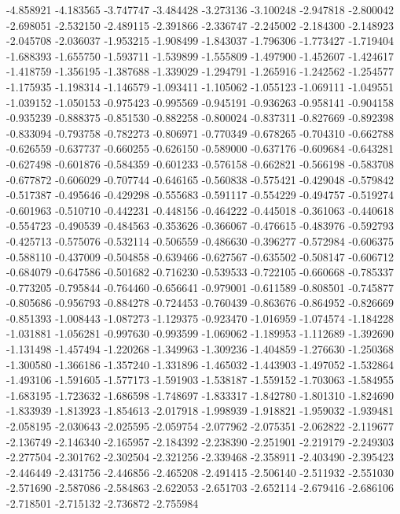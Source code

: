 -4.858921
-4.183565
-3.747747
-3.484428
-3.273136
-3.100248
-2.947818
-2.800042
-2.698051
-2.532150
-2.489115
-2.391866
-2.336747
-2.245002
-2.184300
-2.148923
-2.045708
-2.036037
-1.953215
-1.908499
-1.843037
-1.796306
-1.773427
-1.719404
-1.688393
-1.655750
-1.593711
-1.539899
-1.555809
-1.497900
-1.452607
-1.424617
-1.418759
-1.356195
-1.387688
-1.339029
-1.294791
-1.265916
-1.242562
-1.254577
-1.175935
-1.198314
-1.146579
-1.093411
-1.105062
-1.055123
-1.069111
-1.049551
-1.039152
-1.050153
-0.975423
-0.995569
-0.945191
-0.936263
-0.958141
-0.904158
-0.935239
-0.888375
-0.851530
-0.882258
-0.800024
-0.837311
-0.827669
-0.892398
-0.833094
-0.793758
-0.782273
-0.806971
-0.770349
-0.678265
-0.704310
-0.662788
-0.626559
-0.637737
-0.660255
-0.626150
-0.589000
-0.637176
-0.609684
-0.643281
-0.627498
-0.601876
-0.584359
-0.601233
-0.576158
-0.662821
-0.566198
-0.583708
-0.677872
-0.606029
-0.707744
-0.646165
-0.560838
-0.575421
-0.429048
-0.579842
-0.517387
-0.495646
-0.429298
-0.555683
-0.591117
-0.554229
-0.494757
-0.519274
-0.601963
-0.510710
-0.442231
-0.448156
-0.464222
-0.445018
-0.361063
-0.440618
-0.554723
-0.490539
-0.484563
-0.353626
-0.366067
-0.476615
-0.483976
-0.592793
-0.425713
-0.575076
-0.532114
-0.506559
-0.486630
-0.396277
-0.572984
-0.606375
-0.588110
-0.437009
-0.504858
-0.639466
-0.627567
-0.635502
-0.508147
-0.606712
-0.684079
-0.647586
-0.501682
-0.716230
-0.539533
-0.722105
-0.660668
-0.785337
-0.773205
-0.795844
-0.764460
-0.656641
-0.979001
-0.611589
-0.808501
-0.745877
-0.805686
-0.956793
-0.884278
-0.724453
-0.760439
-0.863676
-0.864952
-0.826669
-0.851393
-1.008443
-1.087273
-1.129375
-0.923470
-1.016959
-1.074574
-1.184228
-1.031881
-1.056281
-0.997630
-0.993599
-1.069062
-1.189953
-1.112689
-1.392690
-1.131498
-1.457494
-1.220268
-1.349963
-1.309236
-1.404859
-1.276630
-1.250368
-1.300580
-1.366186
-1.357240
-1.331896
-1.465032
-1.443903
-1.497052
-1.532864
-1.493106
-1.591605
-1.577173
-1.591903
-1.538187
-1.559152
-1.703063
-1.584955
-1.683195
-1.723632
-1.686598
-1.748697
-1.833317
-1.842780
-1.801310
-1.824690
-1.833939
-1.813923
-1.854613
-2.017918
-1.998939
-1.918821
-1.959032
-1.939481
-2.058195
-2.030643
-2.025595
-2.059754
-2.077962
-2.075351
-2.062822
-2.119677
-2.136749
-2.146340
-2.165957
-2.184392
-2.238390
-2.251901
-2.219179
-2.249303
-2.277504
-2.301762
-2.302504
-2.321256
-2.339468
-2.358911
-2.403490
-2.395423
-2.446449
-2.431756
-2.446856
-2.465208
-2.491415
-2.506140
-2.511932
-2.551030
-2.571690
-2.587086
-2.584863
-2.622053
-2.651703
-2.652114
-2.679416
-2.686106
-2.718501
-2.715132
-2.736872
-2.755984
